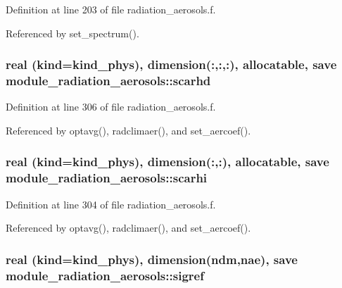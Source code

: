 Definition at line 203 of file radiation\+\_\+aerosols.\+f.



Referenced by set\+\_\+spectrum().

\subsubsection[{\texorpdfstring{scarhd}{scarhd}}]{\setlength{\rightskip}{0pt plus 5cm}real (kind=kind\+\_\+phys), dimension(\+:,\+:,\+:), allocatable, save module\+\_\+radiation\+\_\+aerosols\+::scarhd\hspace{0.3cm}{\ttfamily [private]}}\hypertarget{group__module__radiation__aerosols_ga859ba893a7b0b727ce02f3f29906a0a6}{}\label{group__module__radiation__aerosols_ga859ba893a7b0b727ce02f3f29906a0a6}


Definition at line 306 of file radiation\+\_\+aerosols.\+f.



Referenced by optavg(), radclimaer(), and set\+\_\+aercoef().

\subsubsection[{\texorpdfstring{scarhi}{scarhi}}]{\setlength{\rightskip}{0pt plus 5cm}real (kind=kind\+\_\+phys), dimension(\+:,\+:), allocatable, save module\+\_\+radiation\+\_\+aerosols\+::scarhi\hspace{0.3cm}{\ttfamily [private]}}\hypertarget{group__module__radiation__aerosols_ga439929b1de549fadecc8537bae13e9de}{}\label{group__module__radiation__aerosols_ga439929b1de549fadecc8537bae13e9de}


Definition at line 304 of file radiation\+\_\+aerosols.\+f.



Referenced by optavg(), radclimaer(), and set\+\_\+aercoef().

\subsubsection[{\texorpdfstring{sigref}{sigref}}]{\setlength{\rightskip}{0pt plus 5cm}real (kind=kind\+\_\+phys), dimension(ndm,nae), save module\+\_\+radiation\+\_\+aerosols\+::sigref\hspace{0.3cm}{\ttfamily [private]}}\hypertarget{group__module__radiation__aerosols_ga227ac7558dc0f33c34c34544771617ec}{}\label{group__module__radiation__aerosols_ga227ac7558dc0f33c34c34544771617ec}


